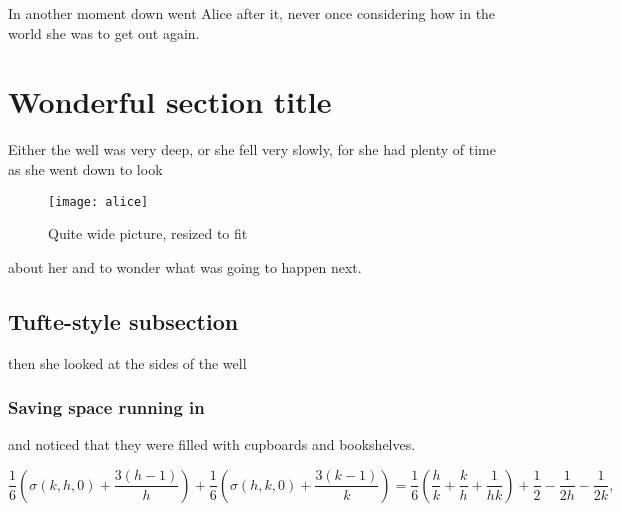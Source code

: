 \documentclass[10pt]{article}
\begin{document}
In another moment down went Alice after it, never once considering how in the world she was to get out again.

\section{Wonderful section title}

Either the well was very deep, or she fell very slowly, for she had plenty of time as she went down to look 
\begin{figure}[htb]
\texttt{[image: alice]}
\caption{Quite wide picture, resized to fit}
\end{figure}
about her and to wonder what was going to happen next.

\subsection{Tufte-style subsection}

then she looked at the sides of the well

\subsubsection{Saving space running in} and noticed that they were filled with cupboards and book\-shel\-ves. 

\begin{dmath}[label={sna74}]
\frac{1}{6} \left(\sigma(k,h,0) +\frac{3(h-1)}{h}\right)
+\frac{1}{6} \left(\sigma(h,k,0) +\frac{3(k-1)}{k}\right)
=\frac{1}{6} \left(\frac{h}{k} +\frac{k}{h} +\frac{1}{hk}\right)
+\frac{1}{2} -\frac{1}{2h} -\frac{1}{2k},
\end{dmath}
\end{document}
